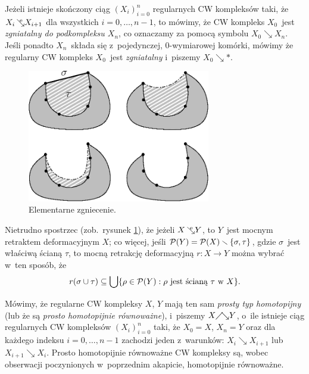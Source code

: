 Jeżeli istnieje skończony ciąg $(X_i)_{i=0}^{n}$ regularnych CW kompleksów taki, że $X_i\mbox{$\hspace{2pt}\searrow\hspace{-9pt}^\mathrm{e}\hspace{2pt}$} X_{i+1}$ dla wszystkich $i=0,\ldots,n-1$, to mówimy, że CW kompleks $X_0$~jest \textit{zgniatalny do podkompleksu $X_n$}, co oznaczamy za pomocą symbolu $X_0\searrow X_n$. Jeśli ponadto $X_n$~składa się z~pojedynczej, $0$-wymiarowej komórki, mówimy że regularny CW kompleks $X_0$~jest \textit{zgniatalny} i~piszemy $X_0\searrow *$.

\begin{figure}[h]
\centering
\includegraphics[width=80mm]{img/elementary-collapse.eps}
\caption{Elementarne zgniecenie.}\label{fig-elementary-collapse}
\end{figure}

Nietrudno spostrzec (zob.~rysunek \ref{fig-elementary-collapse}), że jeżeli $X\mbox{$\hspace{2pt}\searrow\hspace{-9pt}^\mathrm{e}\hspace{2pt}$} Y$, to $Y$~jest mocnym retraktem deformacyjnym $X$; co więcej, jeśli $\mathcal{P}(Y)=\mathcal{P}(X)\smallsetminus \{\sigma,\tau\}$, gdzie $\sigma$~jest właściwą ścianą $\tau$, to mocną retrakcję deformacyjną $r\colon X\to Y$ można wybrać w~ten sposób\label{mocna_retr_def_przy_el_zgnieceniu_ze_jest_fajna}, że \[r(\sigma\cup\tau)\subseteq \bigcup\{\rho\in \mathcal{P}(Y):\rho \text{ jest ścianą } \tau \text{ w } X\}.\] 

Mówimy, że regularne CW kompleksy $X$, $Y$ mają ten sam \textit{prosty typ homotopijny} (lub że są \textit{prosto homotopijnie równoważne}), i~piszemy $X\mbox{$\diagup \hspace{-5pt} \searrow$} Y$, o~ile istnieje ciąg regularnych CW kompleksów $(X_i)_{i=0}^{n}$ taki, że $X_0=X$, $X_n=Y$ oraz dla każdego indeksu $i=0,\ldots,n-1$ zachodzi jeden z~warunków: $X_{i}\searrow X_{i+1}$ lub $X_{i+1}\searrow X_{i}$. Prosto homotopijnie równoważne CW kompleksy są, wobec obserwacji poczynionych w~poprzednim akapicie, homotopijnie równoważne.


